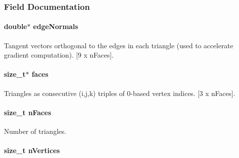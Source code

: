 \subsubsection{Field Documentation}
\hypertarget{structhm_tri_mesh_ab77958f936a48f87b041284aa8a8127f}{
\paragraph[{edge\-Normals}]{\setlength{\rightskip}{0pt plus 5cm}double$\ast$ edge\-Normals}}\label{structhm_tri_mesh_ab77958f936a48f87b041284aa8a8127f}


Tangent vectors orthogonal to the edges in each triangle (used to accelerate gradient computation). \mbox{[}9 x n\-Faces\mbox{]}. 

\hypertarget{structhm_tri_mesh_ac0ddc0ca3b34698286793c9336af359d}{
\paragraph[{faces}]{\setlength{\rightskip}{0pt plus 5cm}size\-\_\-t$\ast$ faces}}\label{structhm_tri_mesh_ac0ddc0ca3b34698286793c9336af359d}


Triangles as consecutive (i,j,k) triples of 0-\/based vertex indices. \mbox{[}3 x n\-Faces\mbox{]}. 

\hypertarget{structhm_tri_mesh_a38de205b6938c9e0db72ac866a803be3}{
\paragraph[{n\-Faces}]{\setlength{\rightskip}{0pt plus 5cm}size\-\_\-t n\-Faces}}\label{structhm_tri_mesh_a38de205b6938c9e0db72ac866a803be3}


Number of triangles. 

\hypertarget{structhm_tri_mesh_aad9ed5da071bc7451fa5f5aeac7c1814}{
\paragraph[{n\-Vertices}]{\setlength{\rightskip}{0pt plus 5cm}size\-\_\-t n\-Vertices}}\label{structhm_tri_mesh_aad9ed5da071bc7451fa5f5aeac7c1814}


